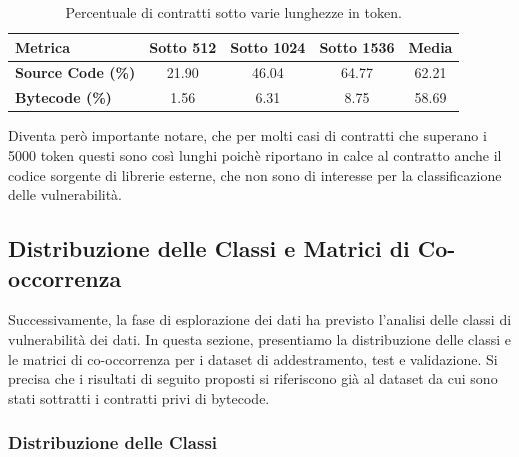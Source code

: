 \documentclass[../../Thesis.tex]{subfiles}
\begin{document}
\begin{table}[h!]
    \centering
    \begin{tabular}{|l|c|c|c|c|}
        \hline
        \textbf{Metrica} & \textbf{Sotto 512} & \textbf{Sotto 1024} & \textbf{Sotto 1536} & \textbf{Media} \\
        \hline
        \textbf{Source Code (\%)} & 21.90 & 46.04 & 64.77 & 62.21 \\
        \textbf{Bytecode (\%)} & 1.56 & 6.31 & 8.75 & 58.69 \\
        \hline
    \end{tabular}
    \caption{Percentuale di contratti sotto varie lunghezze in token.}
    \label{tab:summary}
\end{table}


Diventa però importante notare, che per molti casi di contratti che superano i 5000 token questi sono così lunghi poichè riportano in calce al contratto anche il codice sorgente di librerie esterne, che non sono di interesse per la classificazione delle vulnerabilità. 


\subsection{Distribuzione delle Classi e Matrici di Co-occorrenza}
Successivamente, la fase di esplorazione dei dati ha previsto l'analisi delle classi di vulnerabilità dei dati. In questa sezione, presentiamo la distribuzione delle classi e le matrici di co-occorrenza per i dataset di addestramento, test e validazione. Si precisa che i risultati di seguito proposti si riferiscono già al dataset da cui sono stati sottratti i contratti privi di bytecode.

\subsubsection{Distribuzione delle Classi}
\end{document}
